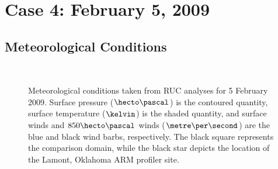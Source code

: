 \section{Case 4: February 5, 2009}
\label{feb5-46}

\subsection{Meteorological Conditions}
\label{mc-461}


\begin{figure}[H]
     \begin{center}
%
        \\ %
%
    \end{center}
    \caption{%
        Meteorological conditions taken from RUC analyses for 5 February 2009. Surface pressure ($\hecto\pascal$) is the contoured quantity, surface temperature ($\kelvin$) is the shaded quantity, and surface winds and $850\hecto\pascal$ winds ($\metre\per\second$) are the blue and black wind barbs, respectively. The black square represents the comparison domain, while the black star depicts the location of the Lamont, Oklahoma ARM profiler site.}%
   \label{figure426}
\end{figure}



